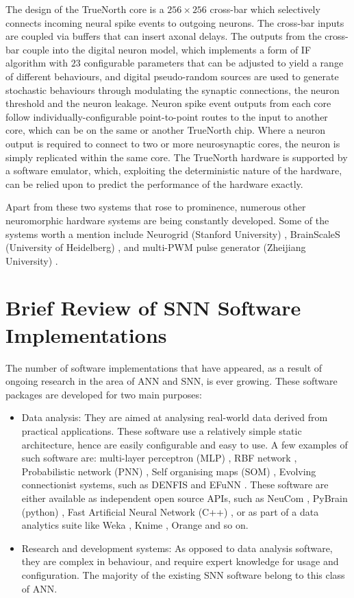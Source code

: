 The design of the TrueNorth core is a $256 \times 256$ cross-bar which selectively connects incoming
neural spike events to outgoing neurons. The cross-bar inputs are coupled via buffers that can insert axonal delays. The outputs from the cross-bar couple into the digital neuron model, which implements a form of IF algorithm with $23$ configurable parameters that can be adjusted to yield a range of different behaviours, and digital pseudo-random sources are used to generate stochastic behaviours through modulating the synaptic connections, the neuron threshold and the neuron leakage. Neuron spike event outputs from each core follow individually-configurable point-to-point routes to the input to another core, which can be on the same or another TrueNorth chip. Where a neuron output is required to connect to two or more neurosynaptic cores, the neuron is simply replicated within the same core. The TrueNorth hardware is supported by a software emulator, which, exploiting the deterministic nature of the hardware, can be relied upon to predict the performance of the hardware exactly.

Apart from these two systems that rose to prominence, numerous other neuromorphic hardware systems are being constantly developed. Some of the systems worth a mention include Neurogrid (Stanford University) \citep{boahen2006neurogrid,}, BrainScaleS (University of Heidelberg) \citep{markram2011introducing}, and multi-PWM pulse generator (Zheijiang University) \citep{li2005multi}.

\section{Brief Review of SNN Software Implementations}
The number of software implementations that have appeared, as a result of ongoing research in the area of ANN and SNN, is ever growing. These software packages are developed for two main purposes:

\begin{itemize}
	\item Data analysis: They are aimed at analysing real-world data derived from practical applications. These software use a relatively simple static architecture, hence are easily configurable and easy to use. A few examples of such software are: multi-layer perceptron (MLP) \citep{baum1988capabilities}, RBF network \citep{park1991universal}, Probabilistic network (PNN) \citep{specht1990probabilistic}, Self organising maps (SOM) \citep{kohonen1998self}, Evolving connectionist systems, such as DENFIS and EFuNN \citep{kasabov2007evolving}. These software are either available as independent open source APIs, such as NeuCom \citep{neucom}, PyBrain (python) \citep{schaul2010pybrain}, Fast Artificial Neural Network (C++) \citep{nissen2000fast}, or as part of a data analytics suite like Weka \citep{hall2009weka}, Knime \citep{berthold2008knime}, Orange \citep{demvsar2004orange} and so on.
	\item Research and development systems: As opposed to data analysis software, they are complex in behaviour, and require expert knowledge for usage and configuration. The majority of the existing SNN software belong to this class of ANN.
\end{itemize}

